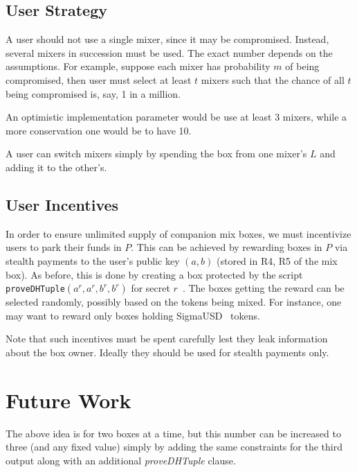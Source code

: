 \documentclass[runningheads]{llncs}
\begin{document}
\subsection{User Strategy}

A user should not use a single mixer, since it may be compromised. Instead, several mixers in succession must be used.
The exact number depends on the assumptions.
For example, suppose each mixer has probability $m$ of being compromised, then user must select at least $t$ mixers such that the chance of all
$t$ being compromised is, say, 1 in a million.

An optimistic implementation parameter would be use at least 3 mixers, while a more conservation one would be to have 10.

A user can switch mixers simply by spending the box from one mixer's $L$ and adding it to the other's.

\subsection{User Incentives}

In order to ensure unlimited supply of companion mix boxes, we must incentivize users to park their funds in $P$.
This can be achieved by rewarding boxes in $P$ via stealth payments to the user's public key $(a, b)$ (stored in R4, R5 of the mix box). As before,
this is done by creating a box protected by the script \texttt{proveDHTuple}$(a^r, a^r, b^r, b^r)$ for secret $r$~\cite{stealth-payments}.
The boxes getting the reward can be selected randomly, possibly based on the tokens being mixed. For instance, one may want to reward only boxes holding SigmaUSD~\cite{sigma-usd} tokens.

Note that such incentives must be spent carefully lest they leak information about the box owner. Ideally they should be used for
stealth payments only.

\section{Future Work}

The above idea is for two boxes at a time, but this number can be increased to three (and any fixed value) simply by adding the same constraints for the third output along with an additional {\em proveDHTuple} clause.




\appendix
\end{document}
